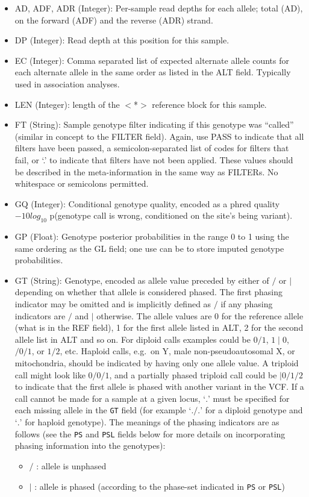 \documentclass[8pt]{article}
\begin{document}
\begin{itemize}
\renewcommand{\labelitemii}{$\circ$}
  \item AD, ADF, ADR (Integer): Per-sample read depths for each allele; total (AD), on the forward (ADF) and the reverse (ADR) strand.
  \item DP (Integer): Read depth at this position for this sample.
  \item EC (Integer): Comma separated list of expected alternate allele counts for each alternate allele in the same order as listed in the ALT field.
  Typically used in association analyses.
  \item LEN (Integer): length of the $<$*$>$ reference block for this sample.
  \item FT (String): Sample genotype filter indicating if this genotype was ``called'' (similar in concept to the FILTER field).
  Again, use PASS to indicate that all filters have been passed, a semicolon-separated list of codes for filters that fail, or `.' to indicate that filters have not been applied.
  These values should be described in the meta-information in the same way as FILTERs.
  No whitespace or semicolons permitted.
  \item GQ (Integer): Conditional genotype quality, encoded as a phred quality $-10log_{10}$ p(genotype call is wrong, conditioned on the site's being variant).
  \item GP (Float): Genotype posterior probabilities in the range 0 to 1 using the same ordering as the GL field; one use can be to store imputed genotype probabilities.
  \item GT (String): Genotype, encoded as allele value preceded by either of $/$ or $\mid$ depending on whether that allele is considered phased. 
    The first phasing indicator may be omitted and is implicitly defined as $/$ if any phasing indicators are $/$ and $\mid$ otherwise.
    The allele values are 0 for the reference allele (what is in the REF field), 1 for the first allele listed in ALT, 2 for the second allele list in ALT and so on.
    For diploid calls examples could be $0/1$, $1\mid0$, $/0/1$, or $1/2$, etc.
    Haploid calls, e.g.\ on Y, male non-pseudoautosomal X, or mitochondria, should be indicated by having only one allele value.
    A triploid call might look like $0/0/1$, and a partially phased triploid call could be $|0/1/2$ to indicate that the first allele is phased with another variant in the VCF.
    If a call cannot be made for a sample at a given locus, `$.$' must be specified for each missing allele in the {\tt GT} field (for example `$./.$' for a diploid genotype and `$.$' for haploid genotype).
    The meanings of the phasing indicators are as follows (see the {\tt PS} and {\tt PSL} fields below for more details on incorporating phasing information into the genotypes):
    \begin{itemize}
      \item $/$ : allele is unphased
      \item $\mid$ : allele is phased (according to the phase-set indicated in {\tt PS} or {\tt PSL})
    \end{itemize}


\end{itemize}
\end{document}
